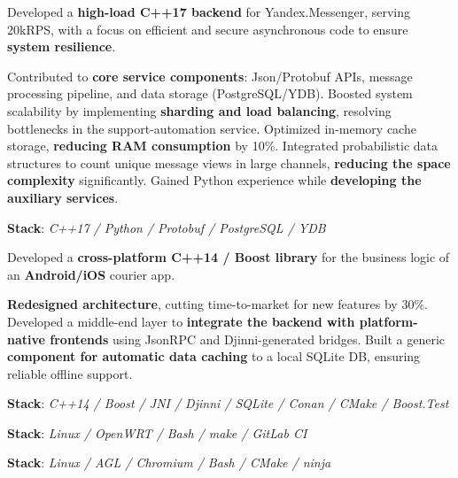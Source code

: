 \documentclass[]{deedy-resume}
\begin{document}
\begin{minipage}[t]{0.70\textwidth}
\sectionspace



Developed a \textbf{high-load C++17 backend} for Yandex.Messenger, serving 20kRPS, with a focus on efficient and secure asynchronous code to ensure \textbf{system resilience}.
\begin{descritemize}
    \descritem Contributed to \textbf{core service components}: Json/Protobuf APIs, message processing pipeline, and data storage (PostgreSQL/YDB).
    \descritem Boosted system scalability by implementing  \textbf{sharding and load balancing}, resolving bottlenecks in the support-automation service.
    \descritem Optimized in-memory cache storage, \textbf{reducing RAM consumption} by 10\%.
    \descritem Integrated probabilistic data structures to count unique message views in large channels, \textbf{reducing the space complexity} significantly.
    \descritem Gained Python experience while \textbf{developing the auxiliary services}.
\end{descritemize}
\textbf{Stack}: \textit{C++17 / Python / Protobuf / PostgreSQL / YDB}

\sectionspace



Developed a \textbf{cross-platform C++14 / Boost library} for the business logic of an \textbf{Android/iOS} courier app.
\begin{descritemize}
    \descritem \textbf{Redesigned architecture}, cutting time-to-market for new features by 30\%.
    \descritem Developed a middle-end layer to \textbf{integrate the backend with platform-native frontends} using JsonRPC and Djinni-generated bridges.
    \descritem Built a generic \textbf{component for automatic data caching} to a local SQLite DB, ensuring reliable offline support. 
\end{descritemize}
\textbf{Stack}: \textit{C++14 / Boost / JNI / Djinni / SQLite / Conan / CMake / Boost.Test}

\sectionspace


\textbf{Stack}: \textit{Linux / OpenWRT / Bash / make /  GitLab CI}
\sectionspace


\textbf{Stack}: \textit{Linux / AGL / Chromium / Bash / CMake / ninja}

\end{minipage}
\end{document}
